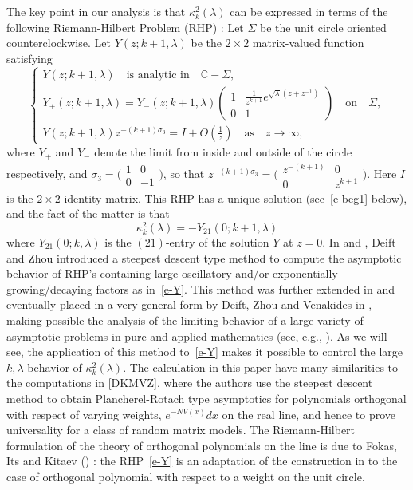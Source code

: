 \documentclass{amsart}
\theoremstyle{definition}
\theoremstyle{remark}
\numberwithin{equation}{section}
\newcommand{\C}{\mathbb C}
\begin{document}
The key point in our analysis is that
$\kappa^2_{k}(\lambda)$ can be expressed in terms of 
the following Riemann-Hilbert Problem (RHP) :
Let $\Sigma$ be the unit circle oriented counterclockwise.
Let $Y(z;k+1,\lambda)$ be the $2\times 2$ matrix-valued function satisfying
\begin{equation}\label{e-Y}
  \begin{cases}
     Y(z;k+1,\lambda) \quad\text{is analytic in}\quad \C-\Sigma,\\
     Y_+(z;k+1,\lambda)=Y_-(z;k+1,\lambda) \begin{pmatrix}
1&\frac{1}{z^{k+1}}e^{\sqrt{\lambda}(z+z^{-1})}\\0&1 \end{pmatrix}
\quad\text{on}\quad \Sigma,\\
     Y(z;k+1,\lambda) z^{-(k+1)\sigma_3}
=I+O(\frac1{z}) \quad\text{as}\quad z\to\infty,
  \end{cases}
\end{equation}
where $Y_+$ and $Y_-$ denote the limit from inside and outside of
the circle respectively, and $\sigma_3=
\bigl( \begin{smallmatrix} 1&0\\0&-1 \end{smallmatrix} \bigr)$, 
so that $z^{-(k+1)\sigma_3}=
\bigl( \begin{smallmatrix} z^{-(k+1)}&0\\
0&z^{k+1} \end{smallmatrix} \bigr)$.
Here $I$ is the $2\times 2$ identity matrix.
This RHP has a unique solution  
(see~\eqref{e-beg1} below), and the fact of the matter is that
\begin{equation}\label{e-Y21}
   \kappa^2_{k}(\lambda)=-Y_{21}(0;k+1,\lambda)
\end{equation}
where $Y_{21}(0;k,\lambda)$ is the $(21)$-entry of the solution
$Y$ at $z=0$.
In \cite{DZ1} and \cite{DZ}, Deift and Zhou introduced a steepest descent 
type method to compute the asymptotic behavior of RHP's containing 
large oscillatory and/or exponentially growing/decaying factors as in~\eqref{e-Y}.
This method was further extended in \cite{DVZ2} and eventually placed 
in a very general form by Deift, Zhou and Venakides in \cite{DVZ}, 
making possible the analysis of the limiting behavior 
of a large variety of asymptotic problems in pure and applied mathematics 
(see, e.g., \cite{DIZ}).
As we will see, the application of this method to~\eqref{e-Y} makes it possible 
to control the large $k,\lambda$ behavior of $\kappa_k^2(\lambda)$. 
The calculation in this paper have many similarities to the computations 
in [DKMVZ], where the authors use the steepest descent method to obtain 
Plancherel-Rotach type asymptotics for polynomials orthogonal with respect of 
varying weights, $e^{-NV(x)}dx$ on the real line, and hence to prove  
universality for a class of random matrix models.
The Riemann-Hilbert formulation of the theory of orthogonal 
polynomials on the line is due to Fokas, Its and Kitaev (\cite{FIK}) : 
the RHP~\eqref{e-Y} is an adaptation of the construction in \cite{FIK} 
to the case of orthogonal polynomial with respect to a weight 
on the unit circle.
\end{document}
